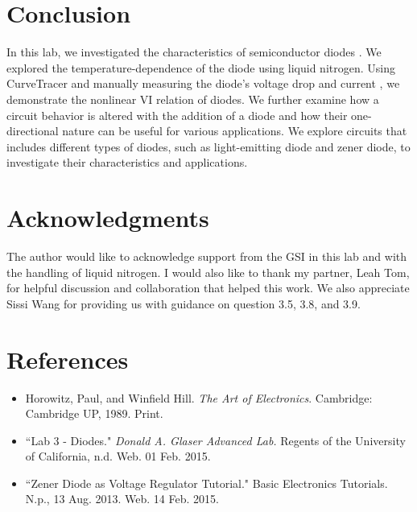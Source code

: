 \documentclass[authoryear, 12pt,5p, times]{elsarticle}
\begin{document}
\section*{Conclusion}
In this lab, we investigated the characteristics of semiconductor diodes . We explored the temperature-dependence of the diode using liquid nitrogen. Using CurveTracer and manually measuring the diode's voltage drop and current , we demonstrate the nonlinear VI relation of diodes. We further examine how a circuit behavior is altered with the addition of a diode and how their one-directional nature can be useful for various applications. %
We explore circuits that includes different types of diodes, such as light-emitting diode and zener diode, to investigate their characteristics and applications. 
\section*{Acknowledgments}
\begin{footnotesize}
The author would like to acknowledge support from the GSI in this lab and with the handling of liquid nitrogen. I would also like to thank my partner, Leah Tom, for helpful discussion and collaboration that helped this work. We also appreciate Sissi Wang for providing us with guidance on question 3.5, 3.8, and 3.9.
\end{footnotesize}
  \section*{References}
 \begin{footnotesize}
 \begin{itemize}
 \item Horowitz, Paul, and Winfield Hill. \textit{The Art of Electronics}. Cambridge: Cambridge UP, 1989. Print.
 \item ``Lab 3 - Diodes." \textit{Donald A. Glaser Advanced Lab.} Regents of the University of California, n.d. Web. 01 Feb. 2015.
  \item ``Zener Diode as Voltage Regulator Tutorial." Basic Electronics Tutorials. N.p., 13 Aug. 2013. Web. 14 Feb. 2015.
\end{itemize} 
  \end{footnotesize}
\end{document}
